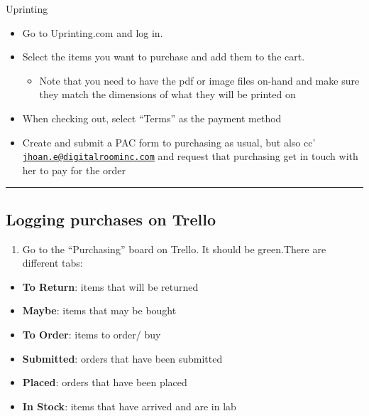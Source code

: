 \documentclass[]{book}
\providecommand{\tightlist}{%
  \setlength{\itemsep}{0pt}\setlength{\parskip}{0pt}}
\begin{document}
Uprinting

\begin{itemize}
\tightlist
\item
  Go to Uprinting.com and log in.
\item
  Select the items you want to purchase and add them to the cart.

  \begin{itemize}
  \tightlist
  \item
    Note that you need to have the pdf or image files on-hand and make sure they match the dimensions of what they will be printed on
  \end{itemize}
\item
  When checking out, select ``Terms'' as the payment method
\item
  Create and submit a PAC form to purchasing as usual, but also cc' \href{mailto:jhoan.e@digitalroominc.com}{\nolinkurl{jhoan.e@digitalroominc.com}} and request that purchasing get in touch with her to pay for the order
\end{itemize}

\begin{center}\rule{0.5\linewidth}{\linethickness}\end{center}

\hypertarget{logging-purchases-on-trello}{%
\subsection{Logging purchases on Trello}\label{logging-purchases-on-trello}}

\begin{enumerate}
\def\labelenumi{\arabic{enumi}.}
\tightlist
\item
  Go to the ``Purchasing'' board on Trello. It should be green.There are different tabs:
\end{enumerate}

\begin{itemize}
\tightlist
\item
  \textbf{To Return}: items that will be returned
\item
  \textbf{Maybe}: items that may be bought
\item
  \textbf{To Order}: items to order/ buy
\item
  \textbf{Submitted}: orders that have been submitted
\item
  \textbf{Placed}: orders that have been placed
\item
  \textbf{In Stock}: items that have arrived and are in lab
\end{itemize}
\end{document}
